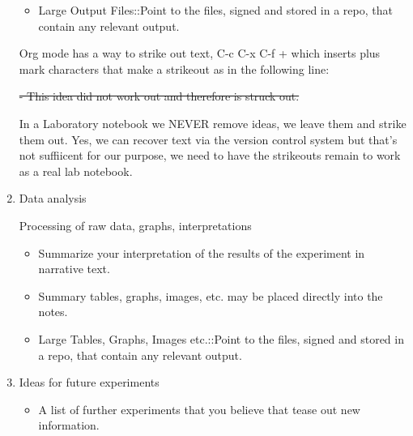 \documentclass[11pt]{article}
\begin{document}
\begin{enumerate}
\begin{itemize}
\item Large Output Files::Point to the files, signed and stored in a repo,
that contain any relevant output.
\end{itemize}

Org mode has a way to strike out text, C-c C-x C-f + which inserts
plus mark characters that make a strikeout as in the following line:

\sout{- This idea did not work out and therefore is struck out.}

In a Laboratory notebook we NEVER remove ideas, we leave them and
strike them out.  Yes, we can recover text via the version control
system but that's not suffiicent for our purpose, we need to have the
strikeouts remain to work as a real lab notebook.

\item Data analysis
\label{sec:org35080be}

Processing of raw data, graphs, interpretations

\begin{itemize}
\item Summarize your interpretation of the results of the experiment in
narrative text.

\item Summary tables, graphs, images, etc. may be placed directly into the
notes.

\item Large Tables, Graphs, Images etc.::Point to the files, signed and
stored in a repo, that contain any relevant output.
\end{itemize}

\item Ideas for future experiments
\label{sec:org2eaf3e4}

\begin{itemize}
\item A list of further experiments that you believe that tease out new
information.
\end{itemize}
\end{enumerate}
\end{document}
